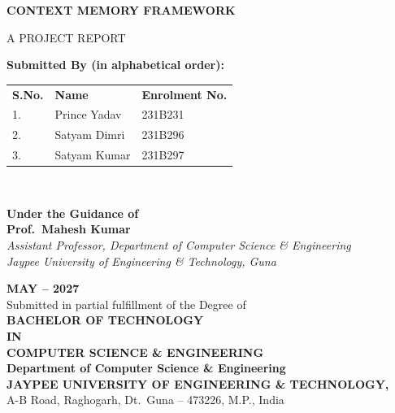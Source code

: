 \begin{titlepage}
\begin{center}

{\fontsize{18}{27}\selectfont \textbf{CONTEXT MEMORY FRAMEWORK}\\}

\vspace{1.2cm}
{\fontsize{14}{21}\selectfont A PROJECT REPORT\\}

\vspace{1.0cm}
{\fontsize{14}{21}\selectfont \textbf{Submitted By (in alphabetical order):}\\}
\vspace{0.5cm}
{\fontsize{14}{21}\selectfont
\begin{tabular}{lll}
    \textbf{S.No.} & \textbf{Name}          & \textbf{Enrolment No.} \\[6pt]
    1.             & Prince Yadav           & 231B231 \\[4pt]
    2.             & Satyam Dimri           & 231B296 \\[4pt]
    3.             & Satyam Kumar           & 231B297 \\
\end{tabular}\\}

\vspace{1.2cm}
{\fontsize{14}{21}\selectfont \textbf{Under the Guidance of}\\}
\vspace{0.3cm}
{\fontsize{15}{22}\selectfont \textbf{Prof.\ Mahesh Kumar}\\}
{\fontsize{12}{18}\selectfont \textit{Assistant Professor, Department of Computer Science \& Engineering}\\}
{\fontsize{12}{18}\selectfont \textit{Jaypee University of Engineering \& Technology, Guna}\\}

\vfill

{\fontsize{14}{21}\selectfont \textbf{MAY -- 2027}\\}
\vspace{0.8cm}
{\fontsize{13}{20}\selectfont Submitted in partial fulfillment of the Degree of\\}
\vspace{0.3cm}
{\fontsize{14}{21}\selectfont \textbf{BACHELOR OF TECHNOLOGY}\\}
{\fontsize{13}{20}\selectfont \textbf{IN}\\}
{\fontsize{13}{20}\selectfont \textbf{COMPUTER SCIENCE \& ENGINEERING}\\}
\vspace{0.8cm}
{\fontsize{14}{21}\selectfont \textbf{Department of Computer Science \& Engineering}\\}
{\fontsize{13}{20}\selectfont \textbf{JAYPEE UNIVERSITY OF ENGINEERING \& TECHNOLOGY,}\\}
{\fontsize{13}{20}\selectfont A-B Road, Raghogarh, Dt.\ Guna -- 473226, M.P., India\\}

\end{center}
\end{titlepage}
